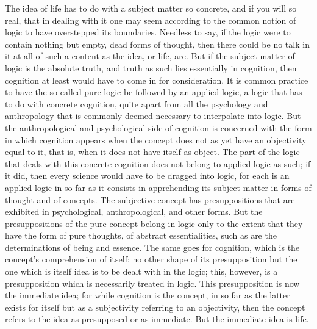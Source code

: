The idea of life has to do with
a subject matter so concrete,
and if you will so real,
that in dealing with it one may seem
according to the common notion of logic
to have overstepped its boundaries.
Needless to say, if the logic were to contain
nothing but empty, dead forms of thought,
then there could be no talk in it at all
of such a content as the idea, or life, are.
But if the subject matter of logic is the absolute truth,
and truth as such lies essentially in cognition,
then cognition at least would have to come in for consideration.
It is common practice to have the so-called pure logic
be followed by an applied logic,
a logic that has to do with concrete cognition,
quite apart from all the psychology and anthropology
that is commonly deemed necessary to interpolate into logic.
But the anthropological and psychological side of
cognition is concerned with the form in which cognition appears
when the concept does not as yet have an objectivity equal to it,
that is, when it does not have itself as object.
The part of the logic that deals with this
concrete cognition does not belong to applied logic as such;
if it did, then every science would have to be dragged into logic,
for each is an applied logic in so far as
it consists in apprehending its subject matter
in forms of thought and of concepts.
The subjective concept has presuppositions
that are exhibited in psychological, anthropological, and other forms.
But the presuppositions of the pure concept
belong in logic only to the extent that
they have the form of pure thoughts, of abstract essentialities,
such as are the determinations of being and essence.
The same goes for cognition,
which is the concept's comprehension of itself:
no other shape of its presupposition
but the one which is itself idea
is to be dealt with in the logic;
this, however, is a presupposition
which is necessarily treated in logic.
This presupposition is now the immediate idea;
for while cognition is the concept,
in so far as the latter exists for itself
but as a subjectivity referring to an objectivity,
then the concept refers to the idea
as presupposed or as immediate.
But the immediate idea is life.

